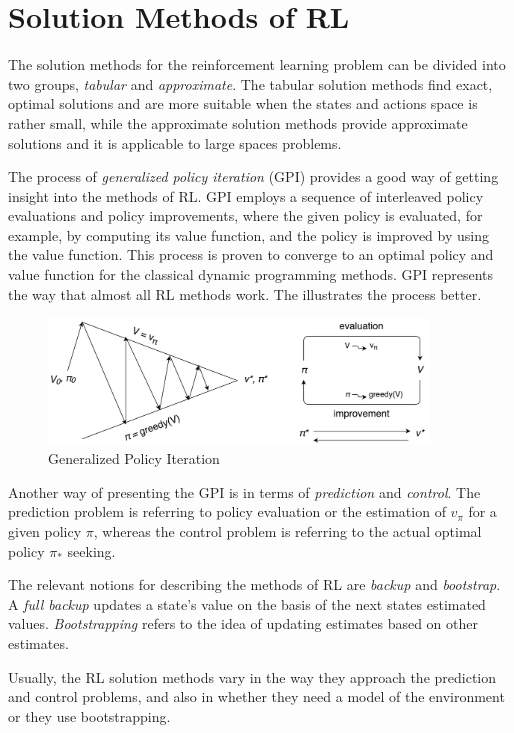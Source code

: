 \section{Solution Methods of RL}\label{Solution Methods}
The solution methods for the reinforcement learning problem can be divided into two groups, \textit{tabular} and \textit{approximate}. The tabular solution methods find exact, optimal solutions and are more suitable when the states and actions space is rather small, while the approximate solution methods provide approximate solutions and it is applicable to large spaces problems.

The process of \textit{generalized policy iteration} (GPI) provides a good way of getting insight into the methods of RL. GPI employs a sequence of interleaved policy evaluations and policy improvements, where the given policy is evaluated, for example, by computing its value function, and the policy is improved by using the value function. This process is proven to converge to an optimal policy and value function for the classical dynamic programming methods. GPI represents the way that almost all RL methods work. The  illustrates the process better.
\begin{figure}[H]
	\centering
	\includegraphics[width=0.9\textwidth]{Figures/GPI}
	\caption{Generalized Policy Iteration}
	\label{fig:GPI}
\end{figure}
Another way of presenting the GPI is in terms of \textit{prediction} and \textit{control}. The prediction problem is referring to policy evaluation or the estimation of $v_{\pi}$ for a given policy $\pi$, whereas the control problem is referring to the actual optimal policy $\pi_{*}$ seeking.

The relevant notions for describing the methods of RL are \textit{backup} and \textit{bootstrap}. A \textit{full backup} updates a state's value on the basis of the next states estimated values. \textit{Bootstrapping} refers to the idea of updating estimates based on other estimates.

Usually, the RL solution methods vary in the way they approach the prediction and control problems, and also in whether they need a model of the environment or they use bootstrapping.

